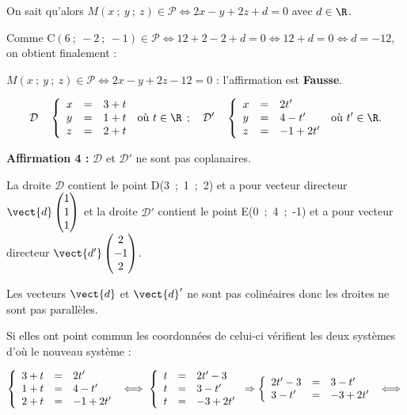 On sait qu'alors $M(x~;~y~;~z) \in \mathcal{P} \iff 2x - y + 2z + d = 0$ avec $d \in \R$.

Comme C$(6~;~-2~;~-1) \in \mathcal{P} \iff 12  + 2 - 2 + d = 0\iff 12 + d = 0 \iff d = - 12$, on obtient finalement :

$M(x~;~y~;~z) \in \mathcal{P} \iff 2x - y + 2z - 12= 0$ : l'affirmation  est \textbf{Fausse}.

\bigskip


\[\mathcal{D}\quad \left\{\begin{array}{l c l}
x&=&3+t\\
y&=&1+t\\
z&=&2+t
\end{array}\right. \:\text{où } t \in \R \:\:;\quad
\mathcal{D}'\quad \left\{\begin{array}{l c l}
x&= &2t'\\
y&=&4 - t'\\
z&=&-1 + 2t'
\end{array}\right. \:\text{où } t' \in \R.\]

\textbf{Affirmation 4 :} $\mathcal{D}$ et $\mathcal{D}'$ ne sont pas coplanaires.

La droite $\mathcal{D}$ contient le point D(3~;~1~;~2) et a pour vecteur directeur $\vect{d}\begin{pmatrix}1\\1\\1\end{pmatrix}$ et la droite $\mathcal{D}'$ contient le point E(0~;~4~;~-1) et a pour vecteur directeur $\vect{d'}\begin{pmatrix}2\\-1\\2\end{pmatrix}$.

Les vecteurs $\vect{d}$ et $\vect{d}'$ ne sont pas colinéaires donc les droites ne sont pas parallèles.

Si elles ont point commun les coordonnées de celui-ci vérifient les deux systèmes d'où le nouveau système :

$\left\{\begin{array}{l c l}
3+t&=&2t'\\
1+t&=&4 - t'\\
2+t&=& - 1+ 2t'
\end{array}\right.\iff \left\{\begin{array}{l c l}
t&=&2t' - 3\\
t&=&3 - t'\\
t&=& - 3+ 2t'
\end{array}\right. \Rightarrow \left\{\begin{array}{l c l}
2t' - 3&=&3 - t'\\
3 - t'&=& - 3+ 2t'
\end{array}\right. \iff $

